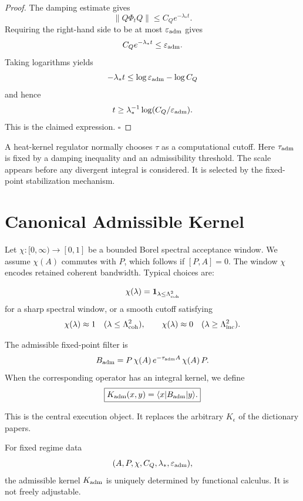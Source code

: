 \documentclass[11pt]{article}
\begin{document}
\begin{proof}
The damping estimate gives
\[
\|Q\Phi_tQ\|\le C_Qe^{-\lambda_\ast t}.
\]
Requiring the right-hand side to be at most \(\varepsilon_{\rm adm}\) gives
\[
C_Qe^{-\lambda_\ast t}\le \varepsilon_{\rm adm}.
\]
Taking logarithms yields
\[
-\lambda_\ast t\le \log \varepsilon_{\rm adm}-\log C_Q
\]
and hence
\[
t\ge \lambda_\ast^{-1}\log(C_Q/\varepsilon_{\rm adm}).
\]
This is the claimed expression. \(\square\)
\end{proof}

\begin{remark}
A heat-kernel regulator normally chooses \(\tau\) as a computational cutoff. Here \(\tau_{\rm adm}\) is fixed by a damping inequality and an admissibility threshold. The scale appears before any divergent integral is considered. It is selected by the fixed-point stabilization mechanism.
\end{remark}

\section{Canonical Admissible Kernel}

Let \(\chi:[0,\infty)\to[0,1]\) be a bounded Borel spectral acceptance window. We assume \(\chi(A)\) commutes with \(P\), which follows if \([P,A]=0\). The window \(\chi\) encodes retained coherent bandwidth. Typical choices are:

\[
\chi(\lambda)=\mathbf 1_{\lambda\le\Lambda_{\rm coh}^2}
\]
for a sharp spectral window, or a smooth cutoff satisfying
\[
\chi(\lambda)\approx1 \quad (\lambda\le\Lambda_{\rm coh}^2),
\qquad
\chi(\lambda)\approx0 \quad (\lambda\ge\Lambda_{\rm inc}^2).
\]

\begin{definition}
The admissible fixed-point filter is
\[
B_{\rm adm}
=
P\,\chi(A)\,e^{-\tau_{\rm adm}A}\,\chi(A)\,P .
\]
When the corresponding operator has an integral kernel, we define
\[
\boxed{
K_{\rm adm}(x,y)
=
\langle x|B_{\rm adm}|y\rangle .
}
\]
\end{definition}

This is the central execution object. It replaces the arbitrary \(K_\epsilon\) of the dictionary papers.

\begin{theorem}
For fixed regime data
\[
(A,P,\chi,C_Q,\lambda_\ast,\varepsilon_{\rm adm}),
\]
the admissible kernel \(K_{\rm adm}\) is uniquely determined by functional calculus. It is not freely adjustable.
\end{theorem}
\end{document}
